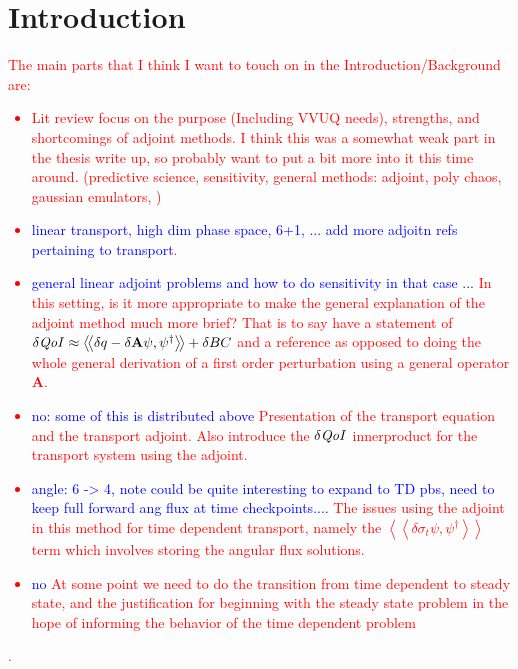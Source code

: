 \documentclass[review]{elsarticle}
\newcommand{\braSN}{\left\langle \! \left\langle}
\newcommand{\ketSN}{\right\rangle \! \right\rangle}
\newcommand{\sigt}{\sigma_t}
\newcommand{\qoi}{{\it QoI}\xspace}
\newcommand{\comment}[2]{\marginpar{\textcolor{#2}{$\star$}}\textcolor{#2}{#1}\newline}
\newcommand{\iwh}[1]{\comment{#1}{red}}
\newcommand{\iwh}[1]{\phantom{a}}
\newcommand{\tcb}[1]{\textcolor{blue}{#1}}
\begin{document}
\section{Introduction}
\iwh{
The main parts that I think I want to touch on in the Introduction/Background are:
\begin{itemize}
\item Lit review focus on the purpose (Including VVUQ needs), strengths, and shortcomings of adjoint methods. I think this was a somewhat weak part in the thesis write up, so probably want to put a bit more into it this time around. (predictive science, sensitivity,  general methods: adjoint, poly chaos, gaussian emulators, )
\item \tcb{linear transport, high dim phase space, 6+1, ... add more adjoitn refs pertaining to transport}. 
\item \tcb{general linear adjoint problems and how to do sensitivity in that case ... } In this setting, is it more appropriate to make the general explanation of the adjoint method much more brief? That is to say have a statement of $\delta \qoi \approx \braSN \delta q - \delta \mathbf{A} \psi , \psi^\dag \ketSN + \delta BC$ and a reference as opposed to doing the whole general derivation of a first order perturbation using a general operator $\mathbf{A}$.
\item \tcb{no: some of this is distributed above} Presentation of the transport equation and the transport adjoint. Also introduce the $\delta \qoi$ innerproduct for the transport system using the adjoint.
\item \tcb{angle: 6 -> 4, note could be quite interesting to expand to TD pbs, need to keep full forward ang flux at time checkpoints....} The issues using the adjoint in this method for time dependent transport, namely the $\braSN  \delta \sigt \psi , \psi^\dag \ketSN$ term which involves storing the angular flux solutions. 
\item \tcb{no} At some point we need to do the transition from time dependent to steady state, and the justification for beginning with the steady state problem in the hope of informing the behavior of the time dependent problem
\end{itemize}
.}

\end{document}
